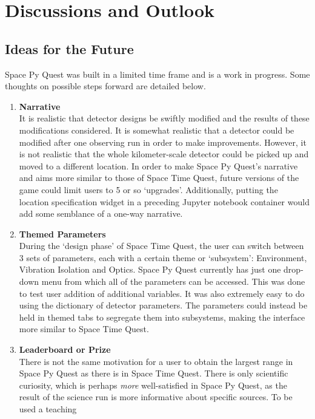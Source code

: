 \documentclass{article}
\begin{document}
\section{Discussions and Outlook}
 
\subsection{Ideas for the Future}
\label{sec:discussion}
Space Py Quest was built in a limited time frame and is a work in
progress. Some thoughts on possible steps forward are detailed below.
\begin{enumerate}
\item \textbf{Narrative}\\
It is realistic that detector designs be swiftly modified and the
results of these modifications considered. It is somewhat realistic
that a detector could be modified after one observing run in order to
make improvements. However, it is not realistic that the whole
kilometer-scale detector could be picked up and moved to a different
location. In order to make Space Py Quest's narrative and aims more
similar to those of Space Time Quest, future versions of the game
could limit users to 5 or so `upgrades'. Additionally, putting the
location specification widget in a preceding Jupyter notebook
container would add some semblance of a one-way narrative. 
\item \textbf{Themed Parameters} \\
    During the `design phase' of Space Time Quest, the user can switch
    between 3 sets of parameters, each with a certain theme or
    `subsystem': Environment, Vibration Isolation and Optics. Space Py
    Quest currently has just one drop-down menu from which all of the
    parameters can be accessed. This was done to test user addition of
    additional variables. It was also extremely easy to do using the
    dictionary of detector parameters. The parameters could instead be
    held in themed tabs to segregate them into subsystems, making the
    interface more similar to Space Time Quest. 
\item \textbf{Leaderboard or Prize} \\
    There is not the same motivation for a user to obtain the largest
    range in Space Py Quest as there is in Space Time Quest. There is
    only scientific curiosity, which is perhaps \textit{more}
    well-satisfied in Space Py Quest, as the result of the science run
    is more informative about specific sources. To be used a teaching

\end{enumerate}
\end{document}
